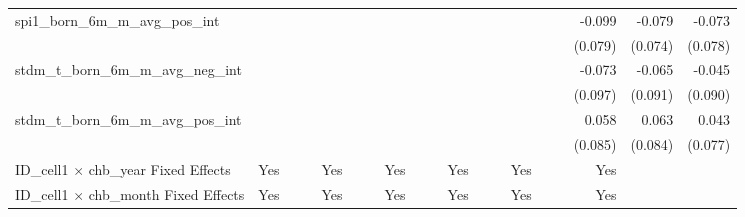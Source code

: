 \begin{tabular}{lrrrrrrrrrrrrrrrrrr}
spi1\_born\_6m\_m\_avg\_pos\_int            &             &             &             &             &             &             &             &             &             &             &             &             &             &             &             &      -0.099 &      -0.079 &      -0.073 \\ 
                                            &             &             &             &             &             &             &             &             &             &             &             &             &             &             &             &     (0.079) &     (0.074) &     (0.078) \\ 
stdm\_t\_born\_6m\_m\_avg\_neg\_int         &             &             &             &             &             &             &             &             &             &             &             &             &             &             &             &      -0.073 &      -0.065 &      -0.045 \\ 
                                            &             &             &             &             &             &             &             &             &             &             &             &             &             &             &             &     (0.097) &     (0.091) &     (0.090) \\ 
stdm\_t\_born\_6m\_m\_avg\_pos\_int         &             &             &             &             &             &             &             &             &             &             &             &             &             &             &             &       0.058 &       0.063 &       0.043 \\ 
                                            &             &             &             &             &             &             &             &             &             &             &             &             &             &             &             &     (0.085) &     (0.084) &     (0.077) \\ 
\midrule
ID\_cell1 $\times$ chb\_year Fixed Effects  &         Yes &             &             &         Yes &             &             &         Yes &             &             &         Yes &             &             &         Yes &             &             &         Yes &             &             \\ 
ID\_cell1 $\times$ chb\_month Fixed Effects &         Yes &             &             &         Yes &             &             &         Yes &             &             &         Yes &             &             &         Yes &             &             &         Yes &             &             \\ 

\end{tabular}
